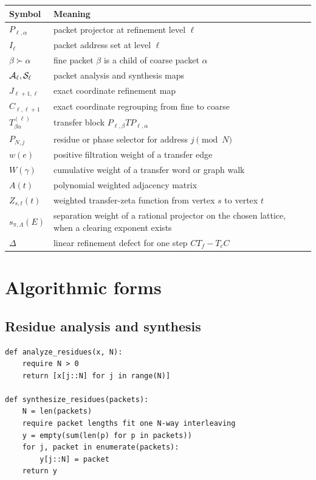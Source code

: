 \begin{longtable}{L{0.28\textwidth}L{0.64\textwidth}}
\toprule
Symbol & Meaning \\
\midrule
\endhead
$P_{\ell,\alpha}$ & packet projector at refinement level $\ell$ \\
$I_\ell$ & packet address set at level $\ell$ \\
$\beta\succ\alpha$ & fine packet $\beta$ is a child of coarse packet $\alpha$ \\
$\mathcal A_\ell,\mathcal S_\ell$ & packet analysis and synthesis maps \\
$J_{\ell+1,\ell}$ & exact coordinate refinement map \\
$C_{\ell,\ell+1}$ & exact coordinate regrouping from fine to coarse \\
$T^{(\ell)}_{\beta\alpha}$ & transfer block $P_{\ell,\beta}TP_{\ell,\alpha}$ \\
$P_{N,j}$ & residue or phase selector for address $j\pmod N$ \\
$w(e)$ & positive filtration weight of a transfer edge \\
$W(\gamma)$ & cumulative weight of a transfer word or graph walk \\
$A(t)$ & polynomial weighted adjacency matrix \\
$Z_{s,t}(t)$ & weighted transfer-zeta function from vertex $s$ to vertex $t$ \\
$s_{\pi,\Lambda}(E)$ & separation weight of a rational projector on the chosen lattice, when a clearing exponent exists \\
$\Delta$ & linear refinement defect for one step $CT_f-T_cC$ \\
\bottomrule
\end{longtable}

\section{Algorithmic forms}\label{sec:algorithms}

\subsection{Residue analysis and synthesis}\label{alg:residue}

\begin{lstlisting}
def analyze_residues(x, N):
    require N > 0
    return [x[j::N] for j in range(N)]

def synthesize_residues(packets):
    N = len(packets)
    require packet lengths fit one N-way interleaving
    y = empty(sum(len(p) for p in packets))
    for j, packet in enumerate(packets):
        y[j::N] = packet
    return y
\end{lstlisting}

